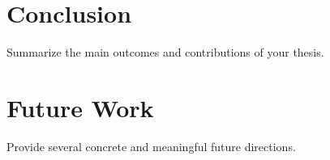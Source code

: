 \section{Conclusion}

Summarize the main outcomes and contributions of your thesis.

\section{Future Work}

Provide several concrete and meaningful future directions.
